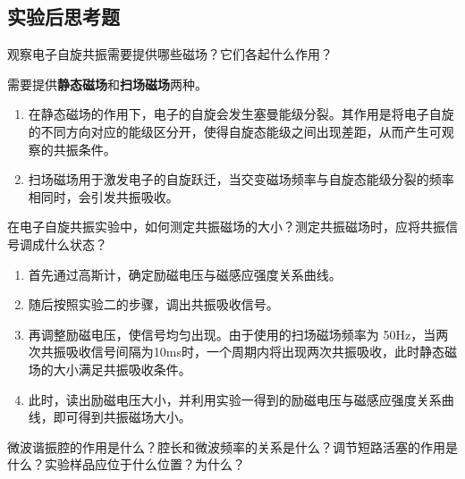 \documentclass[dvipsnames, svgnames,a4paper,11pt]{article}
\begin{document}
	
\clearpage
\subsection{实验后思考题}

\begin{question}
	观察电子自旋共振需要提供哪些磁场？它们各起什么作用？
\end{question}

	需要提供\textbf{静态磁场}和\textbf{扫场磁场}两种。
	\begin{enumerate}
		\item 在静态磁场的作用下，电子的自旋会发生塞曼能级分裂。其作用是将电子自旋的不同方向对应的能级区分开，使得自旋态能级之间出现差距，从而产生可观察的共振条件。
		\item 扫场磁场用于激发电子的自旋跃迁，当交变磁场频率与自旋态能级分裂的频率相同时，会引发共振吸收。
	\end{enumerate}







	
\begin{question}
	在电子自旋共振实验中，如何测定共振磁场的大小？测定共振磁场时，应将共振信号调成什么状态？
\end{question}

	\begin{enumerate}
		\item 首先通过高斯计，确定励磁电压与磁感应强度关系曲线。
		\item 随后按照实验二的步骤，调出共振吸收信号。
		\item 再调整励磁电压，使信号均匀出现。由于使用的扫场磁场频率为 50Hz，当两次共振吸收信号间隔为10ms时，一个周期内将出现两次共振吸收，此时静态磁场的大小满足共振吸收条件。
		\item 此时，读出励磁电压大小，并利用实验一得到的励磁电压与磁感应强度关系曲线，即可得到共振磁场大小。
	\end{enumerate}








\begin{question}
	微波谐振腔的作用是什么？腔长和微波频率的关系是什么？调节短路活塞的作用是什么？实验样品应位于什么位置？为什么？
\end{question}
\end{document}
